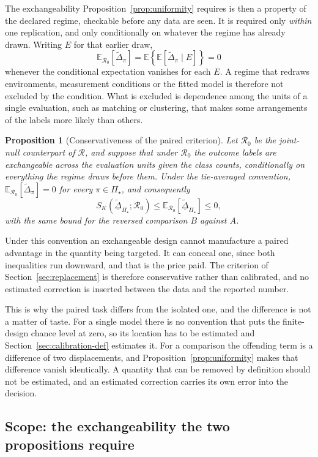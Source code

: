 \documentclass[11pt]{article}
\newcommand{\Regime}{\mathcal{R}}
\newcommand{\PSet}{\Pi_\star}
\newcommand{\E}{\mathbb{E}}
\newcommand{\Dta}{\widetilde{\Delta}}
\newcommand{\RobDta}{\underline{\widetilde{\Delta}}_{\PSet}}
\newtheorem{proposition}{Proposition}
\theoremstyle{remark}
\begin{document}
The exchangeability Proposition~\ref{prop:uniformity} requires is then a property of the declared regime, checkable before any data are seen. It is required only \emph{within} one replication, and only conditionally on whatever the regime has already drawn. Writing $E$ for that earlier draw,
\[
\E_{\Regime_0}\left[\Dta_\pi\right]
=
\E\left\{
\E\left[\Dta_\pi\mid E\right]
\right\}
=
0
\]
whenever the conditional expectation vanishes for each $E$. A regime that redraws environments, measurement conditions or the fitted model is therefore not excluded by the condition. What is excluded is dependence among the units of a single evaluation, such as matching or clustering, that makes some arrangements of the labels more likely than others.

\begin{proposition}[Conservativeness of the paired criterion]
\label{prop:conservative}
Let $\Regime_0$ be the joint-null counterpart of $\Regime$, and suppose that under $\Regime_0$ the outcome labels are exchangeable across the evaluation units given the class counts, conditionally on everything the regime draws before them. Under the tie-averaged convention, $\E_{\Regime_0}[\Dta_\pi]=0$ for every $\pi\in\PSet$, and consequently
\[
S_K(\RobDta;\Regime_0)
\leq
\E_{\Regime_0}[\RobDta]
\leq
0 ,
\]
with the same bound for the reversed comparison $B$ against $A$.
\end{proposition}

Under this convention an exchangeable design cannot manufacture a paired advantage in the quantity being targeted. It can conceal one, since both inequalities run downward, and that is the price paid. The criterion of Section~\ref{sec:replacement} is therefore conservative rather than calibrated, and no estimated correction is inserted between the data and the reported number.

This is why the paired task differs from the isolated one, and the difference is not a matter of taste. For a single model there is no convention that puts the finite-design chance level at zero, so its location has to be estimated and Section~\ref{sec:calibration-def} estimates it. For a comparison the offending term is a difference of two displacements, and Proposition~\ref{prop:uniformity} makes that difference vanish identically. A quantity that can be removed by definition should not be estimated, and an estimated correction carries its own error into the decision.

\subsection{Scope: the exchangeability the two propositions require}
\label{sec:paired-scope}
\end{document}
